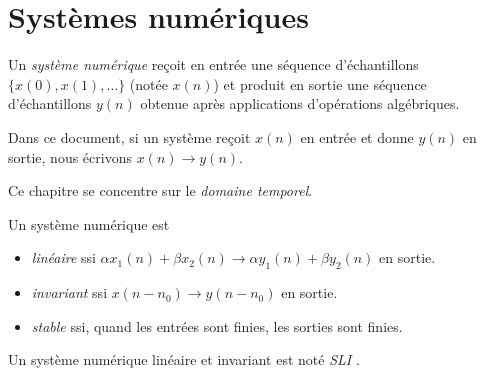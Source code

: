 \chapter{Systèmes numériques}\label{chap:systemesNumeriques}
    Un \textit{système numérique} reçoit en entrée une séquence d'échantillons $\{x(0), x(1), \dots\}$ (notée $x(n)$) et produit en sortie une séquence d'échantillons $y(n)$ obtenue après applications d'opérations algébriques.

    Dans ce document, si un système reçoit $x(n)$ en entrée et donne $y(n)$ en sortie, nous écrivons $x(n) \rightarrow y(n)$.

    Ce chapitre se concentre sur le \textit{domaine temporel}.

    Un système numérique est
    \begin{itemize}
        \item \textit{linéaire} ssi $\alpha x_1(n) + \beta x_2(n) \rightarrow \alpha y_1(n) + \beta y_2(n)$ en sortie.
        \item \textit{invariant} ssi $x(n-n_0) \rightarrow y(n-n_0)$ en sortie.
        \item \textit{stable} ssi, quand les entrées sont finies, les sorties sont finies.
    \end{itemize}

    Un système numérique linéaire et invariant est noté \textit{SLI}  .


